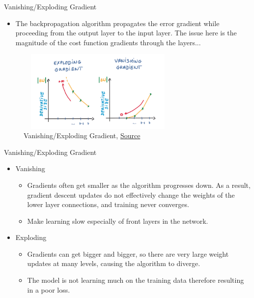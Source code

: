 \documentclass[compress,oilve,t]{beamer}
\begin{document}
\begin{frame}{Vanishing/Exploding Gradient}
	\begin{itemize}
		\item The backpropagation algorithm propagates the error gradient while proceeding from the output layer to the input layer. The issue here is the magnitude of the cost function gradients through the layers... 
	\end{itemize}
	\begin{figure}
		\centering
		\includegraphics[width=8cm, height=4cm]{Figs/van_2.png}
		\caption{Vanishing/Exploding Gradient, \href{https://medium.com/@ayushch612/vanishing-gradient-and-exploding-gradient-problems-7737c0aa535f}{Source}}
	\end{figure}
\end{frame}

\begin{frame}{Vanishing/Exploding Gradient}
	\begin{itemize}
		\item Vanishing
		\begin{itemize}
			\item Gradients often get smaller as the algorithm progresses down. As a result, gradient descent updates do not effectively change the weights of the lower layer connections, and training never converges.
			\medskip
			\item Make learning slow especially of front layers in the network.
			\medskip
		\end{itemize}
		\item Exploding
		\begin{itemize}
			\item Gradients can get bigger and bigger, so there are very large weight updates at many levels, causing the algorithm to diverge.
			\medskip
			\item The model is not learning much on the training data therefore resulting in a poor loss.
			\medskip
		\end{itemize}
	\end{itemize}
\end{frame}
\end{document}
